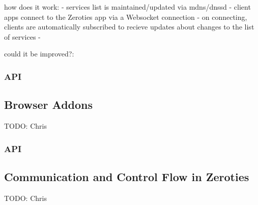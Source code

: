 how does it work:
- services list is maintained/updated via mdns/dnssd
- client apps connect to the Zeroties app via a Websocket connection
- on connecting, clients are automatically subscribed to recieve updates about changes to the list of services
- 

could it be improved?:


\subsubsection{API}

\subsection{Browser Addons}
\label{sub:browser_addons}

TODO: Chris

\subsubsection{API}

\subsection{Communication and Control Flow in Zeroties}
\label{sub:communication}

TODO: Chris